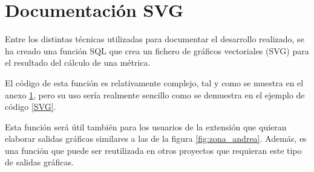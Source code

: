 \chapter{Documentación SVG}\label{anex:svg}

Entre los distintas técnicas utilizadas para documentar el desarrollo realizado, se ha creado una función SQL que crea un fichero de gráficos vectoriales (SVG) para el resultado del cálculo de una métrica. 

El código de esta función es relativamente complejo, tal y como se muestra en el anexo \ref{anex:svg}, pero su uso sería realmente sencillo como se demuestra en el ejemplo de código \ref{SVG}.

Esta función será útil también para los usuarios de la extensión que quieran elaborar salidas gráficas similares a las de la figura \ref{fig:zona_andrea}. Además, es una función que puede ser reutilizada en otros proyectos que requieran este tipo de salidas gráficas.

